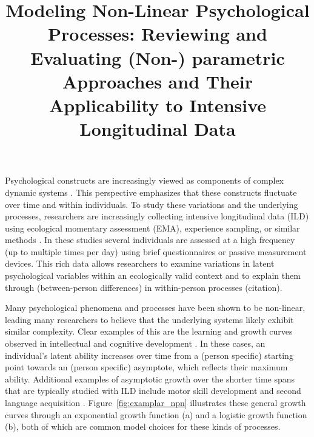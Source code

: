 \documentclass[man, floatsintext]{apa7}
\title{Modeling Non-Linear Psychological Processes: Reviewing and Evaluating
  (Non-) parametric Approaches and Their Applicability to Intensive
  Longitudinal
  Data}
\begin{document}
\maketitle

Psychological constructs are increasingly viewed as components of complex
dynamic systems \parencite{nesselroade_studying_2004, wang_investigating_2012}.
This perspective emphasizes that these constructs fluctuate over time and
within
individuals. To study these variations and the underlying processes,
researchers are increasingly collecting intensive longitudinal data (ILD) using
ecological momentary assessment (EMA), experience sampling, or similar methods
\parencite{fritz_so_2023}. In
these studies several individuals are assessed at a high
frequency (up to multiple times per day) using brief questionnaires or
passive measurement devices. This rich data allows researchers to examine
variations in latent psychological variables within an ecologically valid
context and to explain them through (between-person differences)
in within-person processes (citation).

Many psychological phenomena and processes have been shown to be non-linear,
leading many researchers to believe that the underlying systems likely exhibit
similar complexity. Clear examples of this are the learning and growth curves
observed in intellectual and cognitive development
\parencite{kunnen_dynamic_2012, mcardle_comparative_2002}. In these cases, an
individual's latent ability increases over time from a (person specific)
starting point towards an (person specific) asymptote,
which reflects their maximum ability. Additional examples of
asymptotic growth over the shorter time spans that are typically studied with
ILD include
motor skill development \parencite{newell_time_2001} and second language
acquisition \parencite{de_bot_dynamic_2007}. Figure~\ref{fig:examplar_npn}
illustrates these general growth curves through an exponential growth
function (a) and a logistic growth function (b), both of which are common
model choices for these kinds of processes.
\end{document}
